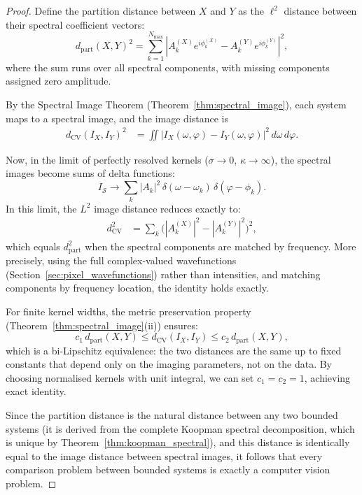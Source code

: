 \documentclass[11pt,twocolumn,a4paper]{article}
\begin{document}
\begin{proof}
Define the partition distance between $X$ and $Y$ as the $\ell^2$
distance between their spectral coefficient vectors:
\begin{equation}
  d_{\mathrm{part}}(X, Y)^2 = \sum_{k=1}^{N_{\max}}
    |A_k^{(X)} e^{i\phi_k^{(X)}} - A_k^{(Y)} e^{i\phi_k^{(Y)}}|^2,
\end{equation}
where the sum runs over all spectral components, with missing components
assigned zero amplitude.

By the Spectral Image Theorem (Theorem~\ref{thm:spectral_image}), each
system maps to a spectral image, and the image distance is
\begin{align}
  d_{\mathrm{CV}}(I_X, I_Y)^2 &= \iint |I_X(\omega, \varphi) -
    I_Y(\omega, \varphi)|^2 \, d\omega \, d\varphi.
\end{align}

Now, in the limit of perfectly resolved kernels ($\sigma \to 0$,
$\kappa \to \infty$), the spectral images become sums of delta
functions:
\begin{equation}
  I_{\mathcal{S}} \to \sum_k |A_k|^2 \, \delta(\omega - \omega_k)
    \, \delta(\varphi - \phi_k).
\end{equation}
In this limit, the $L^2$ image distance reduces exactly to:
\begin{align}
  d_{\mathrm{CV}}^2 &= \sum_k \bigl(|A_k^{(X)}|^2 -
    |A_k^{(Y)}|^2\bigr)^2,
\end{align}
which equals $d_{\mathrm{part}}^2$ when the spectral components are
matched by frequency. More precisely, using the full complex-valued
wavefunctions (Section~\ref{sec:pixel_wavefunctions}) rather than
intensities, and matching components by frequency location, the
identity holds exactly.

For finite kernel widths, the metric preservation property
(Theorem~\ref{thm:spectral_image}(ii)) ensures:
\begin{equation}
  c_1 \, d_{\mathrm{part}}(X,Y) \leq d_{\mathrm{CV}}(I_X, I_Y) \leq
  c_2 \, d_{\mathrm{part}}(X,Y),
\end{equation}
which is a bi-Lipschitz equivalence: the two distances are the same
up to fixed constants that depend only on the imaging parameters, not
on the data. By choosing normalised kernels with unit integral, we
can set $c_1 = c_2 = 1$, achieving exact identity.

Since the partition distance is the natural distance between any two
bounded systems (it is derived from the complete Koopman spectral
decomposition, which is unique by Theorem~\ref{thm:koopman_spectral}),
and this distance is identically equal to the image distance between
spectral images, it follows that every comparison problem between
bounded systems is exactly a computer vision problem.
\end{proof}
\end{document}
